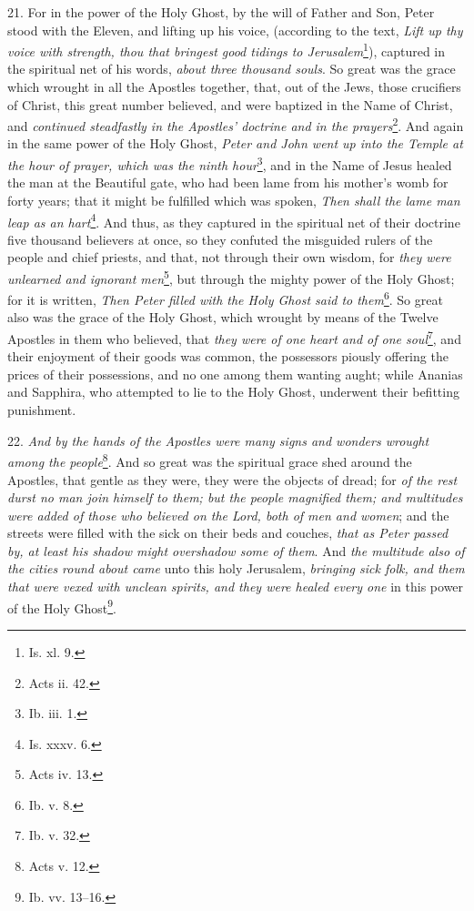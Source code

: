 21. For in the power of the Holy Ghost, by the will of Father and Son, Peter stood with the Eleven, and lifting up his voice, (according to the text, \emph{Lift up thy voice with strength, thou that bringest good tidings to Jerusalem}\footnote{Is. xl. 9.}), captured in the spiritual net of his words, \emph{about three thousand souls}. So great was the grace which wrought in all the Apostles together, that, out of the Jews, those crucifiers of Christ, this great number believed, and were baptized in the Name of Christ, and \emph{continued steadfastly in the Apostles’ doctrine and in the prayers}\footnote{Acts ii. 42.}. And again in the same power of the Holy Ghost, \emph{Peter and John went up into the Temple at the hour of prayer, which was the ninth hour}\footnote{Ib. iii. 1.}, and in the Name of Jesus healed the man at the Beautiful gate, who had been lame from his mother’s womb for forty years; that it might be fulfilled which was spoken, \emph{Then shall the lame man leap as an hart}\footnote{Is. xxxv. 6.}. And thus, as they captured in the spiritual net of their doctrine five thousand believers at once, so they confuted the misguided rulers of the people and chief priests, and that, not through their own wisdom, for \emph{they were unlearned and ignorant men}\footnote{Acts iv. 13.}, but through the mighty power of the Holy Ghost; for it is written, \emph{Then Peter filled with the Holy Ghost said to them}\footnote{Ib. v. 8.}. So great also was the grace of the Holy Ghost, which wrought by means of the Twelve Apostles in them who believed, that \emph{they were of one heart and of one soul}\footnote{Ib. v. 32.}, and their enjoyment of their goods was common, the possessors piously offering the prices of their possessions, and no one among them wanting aught; while Ananias and Sapphira, who attempted to lie to the Holy Ghost, underwent their befitting punishment.

22. \emph{And by the hands of the Apostles were many signs and wonders wrought among the people}\footnote{Acts v. 12.}. And so great was the spiritual grace shed around the Apostles, that gentle as they were, they were the objects of dread; for \emph{of the rest durst no man join himself to them; but the people magnified them; and multitudes were added of those who believed on the Lord, both of men and women}; and the streets were filled with the sick on their beds and couches, \emph{that as Peter passed by, at least his shadow might overshadow some of them}. And \emph{the multitude also of the cities round about came} unto this holy Jerusalem, \emph{bringing sick folk, and them that were vexed with unclean spirits, and they were healed every one} in this power of the Holy Ghost\footnote{Ib. vv. 13–16.}.

